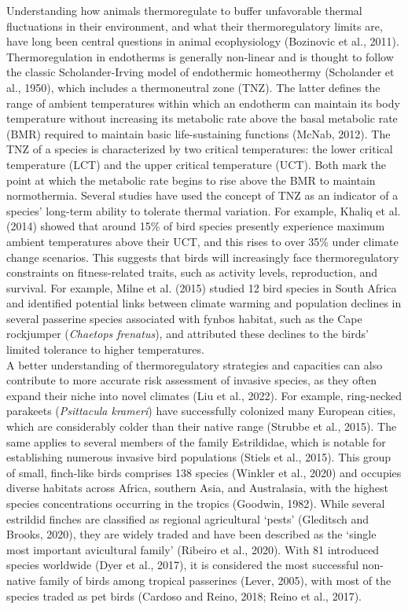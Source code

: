 \documentclass[10pt, twoside]{book} %
\begin{document}
Understanding how animals thermoregulate to buffer unfavorable thermal fluctuations in their environment, and what their thermoregulatory limits are, have long been central questions in animal ecophysiology (Bozinovic et al., 2011). Thermoregulation in endotherms is generally non-linear and is thought to follow the classic Scholander-Irving model of endothermic homeothermy (Scholander et al., 1950), which includes a thermoneutral zone (TNZ). The latter defines the range of ambient temperatures within which an endotherm can maintain its body temperature without increasing its metabolic rate above the basal metabolic rate (BMR) required to maintain basic life-sustaining functions (McNab, 2012). The TNZ of a species is characterized by two critical temperatures: the lower critical temperature (LCT) and the upper critical temperature (UCT). Both mark the point at which the metabolic rate begins to rise above the BMR to maintain normothermia. Several studies have used the concept of TNZ as an indicator of a species' long-term ability to tolerate thermal variation. For example, Khaliq et al. (2014) showed that around 15\% of bird species presently experience maximum ambient temperatures above their UCT, and this rises to over 35\% under climate change scenarios. This suggests that birds will increasingly face thermoregulatory constraints on fitness-related traits, such as activity levels, reproduction, and survival. For example, Milne et al. (2015) studied 12 bird species in South Africa and identified potential links between climate warming and population declines in several passerine species associated with fynbos habitat, such as the Cape rockjumper (\textit{Chaetops frenatus}), and attributed these declines to the birds' limited tolerance to higher temperatures.\\

A better understanding of thermoregulatory strategies and capacities can also contribute to more accurate risk assessment of invasive species, as they often expand their niche into novel climates (Liu et al., 2022). For example, ring-necked parakeets (\textit{Psittacula krameri}) have successfully colonized many European cities, which are considerably colder than their native range (Strubbe et al., 2015). The same applies to several members of the family Estrildidae, which is notable for establishing numerous invasive bird populations (Stiels et al., 2015). This group of small, finch-like birds comprises 138 species (Winkler et al., 2020) and occupies diverse habitats across Africa, southern Asia, and Australasia, with the highest species concentrations occurring in the tropics (Goodwin, 1982). While several estrildid finches are classified as regional agricultural ‘pests’ (Gleditsch and Brooks, 2020), they are widely traded and have been described as the ‘single most important avicultural family’ (Ribeiro et al., 2020). With 81 introduced species worldwide (Dyer et al., 2017), it is considered the most successful non-native family of birds among tropical passerines (Lever, 2005), with most of the species traded as pet birds (Cardoso and Reino, 2018; Reino et al., 2017). \\
\end{document}
